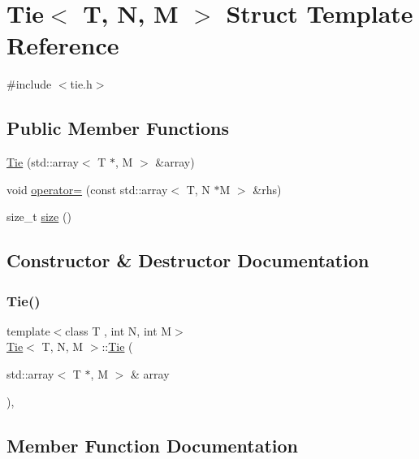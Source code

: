 \hypertarget{structTie}{}\section{Tie$<$ T, N, M $>$ Struct Template Reference}
\label{structTie}


{\ttfamily \#include $<$tie.\+h$>$}

\subsection*{Public Member Functions}
\begin{DoxyCompactItemize}
\item 
\hyperlink{structTie_aa9868d9d2d3f97ac9511c7d62cc64f86}{Tie} (std\+::array$<$ T $\ast$, M $>$ \&array)
\item 
void \hyperlink{structTie_af835eefa6c2e6208589721587d8f743d}{operator=} (const std\+::array$<$ T, N $\ast$M $>$ \&rhs)
\item 
size\+\_\+t \hyperlink{structTie_adcd725ffba3501b45266c52b863795af}{size} ()
\end{DoxyCompactItemize}


\subsection{Constructor \& Destructor Documentation}
\mbox{\label{structTie_aa9868d9d2d3f97ac9511c7d62cc64f86}} 
\subsubsection{\texorpdfstring{Tie()}{Tie()}}
{\footnotesize\ttfamily template$<$class T , int N, int M$>$ \\
\hyperlink{structTie}{Tie}$<$ T, N, M $>$\+::\hyperlink{structTie}{Tie} (\begin{DoxyParamCaption}\item[{std\+::array$<$ T $\ast$, M $>$ \&}]{array }\end{DoxyParamCaption})\hspace{0.3cm}{\ttfamily [inline]}, {\ttfamily [explicit]}}



\subsection{Member Function Documentation}
\mbox{\label{structTie_af835eefa6c2e6208589721587d8f743d}} 
